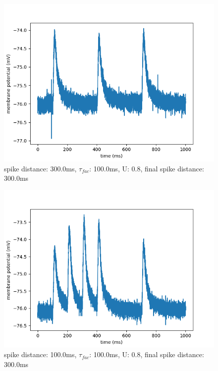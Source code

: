 \documentclass[10pt,a4paper]{scrartcl}
\begin{document}
\begin{figure} [ht]
\begin{center}
\label{fig:abb23}
\caption{spike distance: 300.0ms, $\tau_{fac}$: 100.0ms, U: 0.8, final spike distance: 300.0ms}
\includegraphics[scale=0.35]{pictures/final_spike_variation_12.pdf} 
\end{center}
\end{figure}

\newpage

\begin{figure} [ht]
\begin{center}
\label{fig:abb24}
\caption{spike distance: 100.0ms, $\tau_{fac}$: 100.0ms, U: 0.8, final spike distance: 300.0ms}
\includegraphics[scale=0.35]{pictures/final_spike_variation_13.pdf} 
\end{center}
\end{figure}
\end{document}
